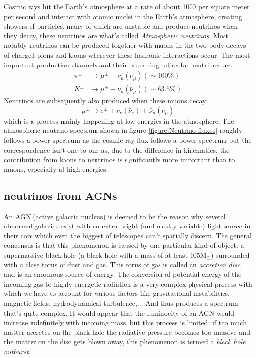 \documentclass[11pt,a4paper,faculty=we,language=en,doctype=report]{cls/ugent-doc}
\begin{document}
Cosmic rays hit the Earth's atmosphere at a rate of about 1000 per square meter
per second and interact with atomic nuclei in the Earth's atmosphere, creating
showers of particles, many of which are unstable and produce neutrinos when
they decay, these neutrinos are what's called \textit{Atmospheric neutrinos}.
Most notably neutrinos can be produced together with muons in the two-body
decays of charged pions and kaons wherever these hadronic interactions occur.
The most important production channels and their branching ratios for neutrinos
are:
\begin{align}
	\pi^\pm &\rightarrow \mu^\pm + \nu_\mu(\bar{\nu}_\mu) (\sim 100\%)\\
	K^\pm &\rightarrow \mu^\pm + \nu_\mu(\bar{\nu}_\mu) (\sim 63.5\%)
\end{align}
Neutrinos are subsequently also produced when these muons decay:
\begin{equation}
	\mu^\pm \rightarrow e^\pm + \nu_e(\bar{\nu}_e) + \bar{\nu}_\mu(\nu_\mu)
\end{equation}
which is a process mainly happening at low energies in the atmosphere.  The
atmospheric neutrino spectrum shown in figure \ref{figure:Neutrino
fluxes} roughly follows a power spectrum as the cosmic ray flux follows a power
spectrum but the correspondence isn't one-to-one as, due to the difference in
kinematics, the contribution from kaons to neutrinos is significantly more
important than to muons, especially at high energies.

\subsection{neutrinos from AGNs}
An AGN (active galactic nucleus) is deemed to be the reason why several abnormal galaxies exist with
an extra bright (and mostly variable) light source in their core which even the biggest of telescopes
can't spatially discern. The general concensus is that this phenomenon is caused by one particular
kind of object: a supermassive black hole (a black hole with a mass of at least 105M$_\odot$) surrounded with
a close torus of dust and gas.
This torus of gas is called an \textit{accretion disc} and is an enormous source of energy. The conversion
of potential energy of the incoming gas to highly energetic radiation is a very complex physical process
with which we have to account for various factors like gravitational instabilities, magnetic fields, hydrodynamical
turbulence,... And thus produces a spectrum that's quite complex.
It would appear that the luminocity of an AGN would increase indefinitely with incoming mass, but this process is 
limited: if too much matter accretes on the black hole the radiative pressure becomes too massive and the 
matter on the disc gets blown away, this phenomenon is termed a \textit{black hole outburst}.
\end{document}
